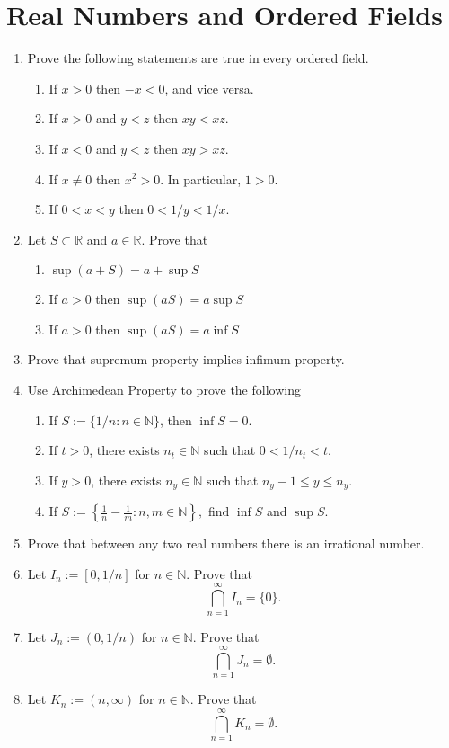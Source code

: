 \documentclass[12pt]{article}
\begin{document}
\section{Real Numbers and Ordered Fields}

\begin{enumerate}

    \item Prove the following statements are true in every ordered field.

    \begin{enumerate}
        \item If $x > 0$ then $-x < 0$, and vice versa.
        \item If $x > 0$ and $y < z$ then $xy < xz$.
        \item If $x < 0$ and $y < z$ then $xy > xz$.
        \item If $x \neq 0$ then $x^2 > 0$. In particular, $1 > 0$.
        \item If $0 < x < y$ then $0 < 1/y < 1/x$.
    \end{enumerate}

    \item Let $S\subset\mathbb{R}$ and $a\in\mathbb{R}$. Prove that
    \begin{enumerate}
        \item $\sup (a+S)=a+\sup S$
        \item If $a>0$ then $\sup (aS)=a\sup S$
        \item If $a>0$ then $\sup (aS)=a\inf S$
    \end{enumerate}
    \item Prove that supremum property implies infimum property.
    \item Use Archimedean Property to prove the following
    \begin{enumerate}
        \item If $S := \{1/n : n \in \mathbb{N}\}$, then $\inf S = 0$.
        \item If $t > 0$, there exists $n_t \in \mathbb{N}$ such that $0 < 1/n_t < t$.
        \item If $y > 0$, there exists $n_y \in \mathbb{N}$ such that $n_y - 1 \leq y \leq n_y$.
        \item If \( S := \left\{ \frac{1}{n} - \frac{1}{m} : n, m \in \mathbb{N} \right\}, \) find \( \inf S \) and \( \sup S \).
    \end{enumerate}
    \item Prove that between any two real numbers there is an irrational number.
    \item Let \( I_n := [0, 1/n] \) for \( n \in \mathbb{N} \). Prove that
    \[
    \bigcap_{n=1}^{\infty} I_n = \{0\}.
    \]

    \item Let \( J_n := (0, 1/n) \) for \( n \in \mathbb{N} \). Prove that
    \[
    \bigcap_{n=1}^{\infty} J_n = \emptyset.
    \]

    \item Let \( K_n := (n, \infty) \) for \( n \in \mathbb{N} \). Prove that
    \[
    \bigcap_{n=1}^{\infty} K_n = \emptyset.
    \]

\end{enumerate}
\end{document}
